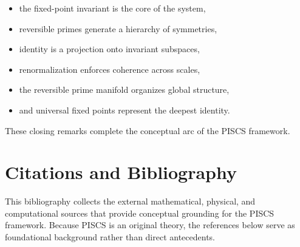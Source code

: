\documentclass[11pt]{article}
\theoremstyle{definition}
\theoremstyle{plain}
\theoremstyle{remark}
\begin{document}
\begin{itemize}
    \item the fixed-point invariant is the core of the system,
    \item reversible primes generate a hierarchy of symmetries,
    \item identity is a projection onto invariant subspaces,
    \item renormalization enforces coherence across scales,
    \item the reversible prime manifold organizes global structure,
    \item and universal fixed points represent the deepest identity.
\end{itemize}

These closing remarks complete the conceptual arc of the PISCS
framework.

\section*{Citations and Bibliography}

This bibliography collects the external mathematical, physical, and
computational sources that provide conceptual grounding for the PISCS
framework. Because PISCS is an original theory, the references below
serve as foundational background rather than direct antecedents.
\end{document}
